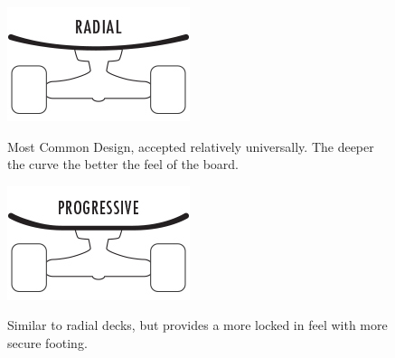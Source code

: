 \documentclass[letterpaper,12pt]{article}
\begin{document}
\begin{itemize}

\begin{figure}[!htbp]\centering

\begin{minipage}{.5\textwidth}\centering
\includegraphics[width=.8\textwidth]{radial.jpg}
\label{radial}
\end{minipage}
\item Most Common Design, accepted relatively universally. The deeper the curve the better the feel of the board.
\end{figure}

\begin{figure}[!htbp]\centering
\begin{minipage}{.5\textwidth}\centering
\includegraphics[width=.8\textwidth]{progressive.jpg}
\label{progressive}
\end{minipage}
\item Similar to radial decks, but provides a more locked in feel with more secure footing.
\end{figure}


\end{itemize}
\end{document}
